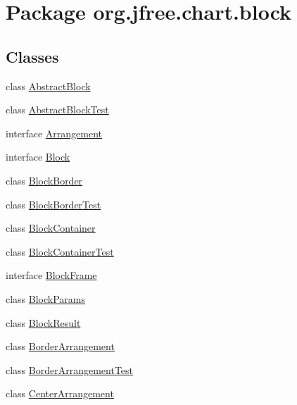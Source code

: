 \hypertarget{namespaceorg_1_1jfree_1_1chart_1_1block}{}\section{Package org.\+jfree.\+chart.\+block}
\label{namespaceorg_1_1jfree_1_1chart_1_1block}
\subsection*{Classes}
\begin{DoxyCompactItemize}
\item 
class \mbox{\hyperlink{classorg_1_1jfree_1_1chart_1_1block_1_1_abstract_block}{Abstract\+Block}}
\item 
class \mbox{\hyperlink{classorg_1_1jfree_1_1chart_1_1block_1_1_abstract_block_test}{Abstract\+Block\+Test}}
\item 
interface \mbox{\hyperlink{interfaceorg_1_1jfree_1_1chart_1_1block_1_1_arrangement}{Arrangement}}
\item 
interface \mbox{\hyperlink{interfaceorg_1_1jfree_1_1chart_1_1block_1_1_block}{Block}}
\item 
class \mbox{\hyperlink{classorg_1_1jfree_1_1chart_1_1block_1_1_block_border}{Block\+Border}}
\item 
class \mbox{\hyperlink{classorg_1_1jfree_1_1chart_1_1block_1_1_block_border_test}{Block\+Border\+Test}}
\item 
class \mbox{\hyperlink{classorg_1_1jfree_1_1chart_1_1block_1_1_block_container}{Block\+Container}}
\item 
class \mbox{\hyperlink{classorg_1_1jfree_1_1chart_1_1block_1_1_block_container_test}{Block\+Container\+Test}}
\item 
interface \mbox{\hyperlink{interfaceorg_1_1jfree_1_1chart_1_1block_1_1_block_frame}{Block\+Frame}}
\item 
class \mbox{\hyperlink{classorg_1_1jfree_1_1chart_1_1block_1_1_block_params}{Block\+Params}}
\item 
class \mbox{\hyperlink{classorg_1_1jfree_1_1chart_1_1block_1_1_block_result}{Block\+Result}}
\item 
class \mbox{\hyperlink{classorg_1_1jfree_1_1chart_1_1block_1_1_border_arrangement}{Border\+Arrangement}}
\item 
class \mbox{\hyperlink{classorg_1_1jfree_1_1chart_1_1block_1_1_border_arrangement_test}{Border\+Arrangement\+Test}}
\item 
class \mbox{\hyperlink{classorg_1_1jfree_1_1chart_1_1block_1_1_center_arrangement}{Center\+Arrangement}}

\end{DoxyCompactItemize}
